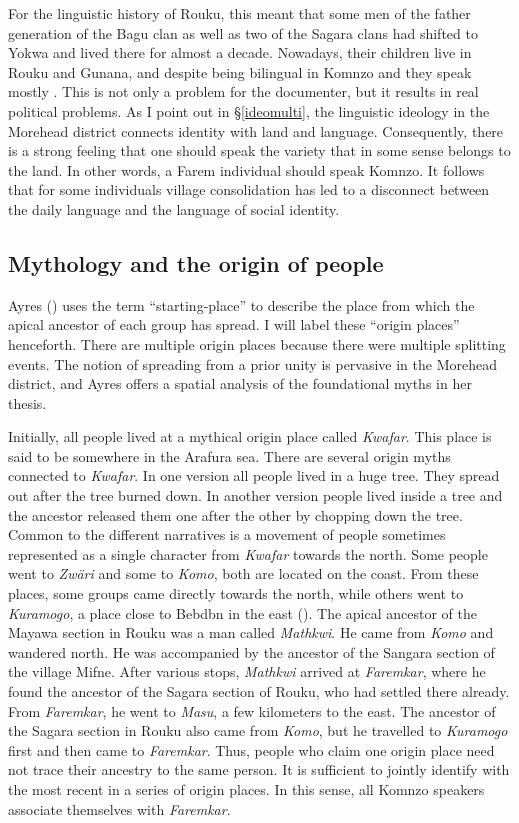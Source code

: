 For the linguistic history of Rouku, this meant that some men of the father generation of the Bagu clan as well as two of the Sagara clans had shifted to Yokwa and lived there for almost a decade. Nowadays, their children live in Rouku and Gunana, and despite being bilingual in Komnzo and  they speak mostly . This is not only a problem for the documenter, but it results in real political problems. As I point out in {\S}\ref{ideomulti}, the linguistic ideology in the Morehead district connects identity with land and language. Consequently, there is a strong feeling that one should speak the variety that in some sense belongs to the land. In other words, a Farem individual should speak Komnzo. It follows that for some individuals village consolidation has led to a disconnect between the daily language and the language of social identity.

\subsection{Mythology and the origin of people}\label{mythology}

Ayres (\citeyear[146]{Ayres:ws}) uses the term ``starting-place'' to describe the place from which the apical ancestor of each group has spread. I will label these ``origin places'' henceforth. There are multiple origin places because there were multiple splitting events. The notion of spreading from a prior unity is pervasive in the Morehead district, and Ayres offers a spatial analysis of the foundational myths in her thesis.

Initially, all people lived at a mythical origin place called \emph{Kwafar}. This place is said to be somewhere in the Arafura sea. There are several origin myths connected to \emph{Kwafar}. In one version all people lived in a huge tree. They spread out after the tree burned down. In another version people lived inside a tree and the ancestor released them one after the other by chopping down the tree. Common to the different narratives is a movement of people {\textendash} sometimes represented as a single character {\textendash} from \emph{Kwafar} towards the north. Some people went to \emph{Zwäri} and some to \emph{Komo}, both are located on the coast. From these places, some groups came directly towards the north, while others went to \emph{Kuramogo}, a place close to Bebdbn in the east (\citealt[292]{Williams:1936transfly}). The apical ancestor of the Mayawa section in Rouku was a man called \emph{Mathkwi}. He came from \emph{Komo} and wandered north. He was accompanied by the ancestor of the Sangara section of the village Mifne. After various stops, \emph{Mathkwi} arrived at \emph{Faremkar}, where he found the ancestor of the Sagara section of Rouku, who had settled there already. From \emph{Faremkar}, he went to \emph{Masu}, a few kilometers to the east. The ancestor of the Sagara section in Rouku also came from \emph{Komo}, but he travelled to \emph{Kuramogo} first and then came to \emph{Faremkar}. Thus, people who claim one origin place need not trace their ancestry to the same person. It is sufficient to jointly identify with the most recent in a series of origin places. In this sense, all Komnzo speakers associate themselves with \emph{Faremkar}.

